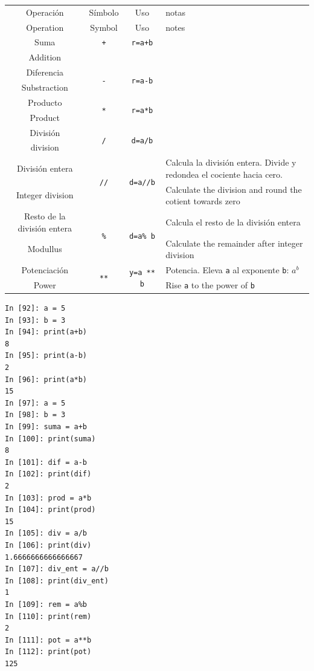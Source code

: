 \begin{table}[h]
\label{tabop}
\centering
\begin{tabularx}{1\textwidth}{cccm{7cm}}
Operación&Símbolo&Uso&notas\\
Operation&Symbol&Uso&notes\\
\hline
Suma&\texttt{+}&\texttt{r=a+b}\\
Addition\\
\hline
Diferencia&\multirow{2}{*}{\texttt{-}}&\multirow{2}{*}{\texttt{r=a-b}}\\
Substraction\\
\hline
Producto&\multirow{2}{*}{\texttt{*}}&\multirow{2}{*}{\texttt{r=a*b}}\\
Product\\
\hline
División&\multirow{2}{*}{\texttt{/}}&\multirow{2}{*}{\texttt{d=a/b}}\\
division\\
\hline
División entera& \multirow{2}{*}{\texttt{//}}& \multirow{2}{*}{\texttt{d=a//b}}&Calcula la división entera. Divide y redondea el cociente hacia cero.\\
Integer division& & &Calculate the division and round the cotient towards zero\\
\hline
Resto de la división entera& \multirow{2}{*}{\texttt{\%}}& \multirow{2}{*}{\texttt{d=a\% b}}& Calcula el resto de la división entera\\
Modullus& & & Calculate the remainder after integer division\\
\hline
Potenciación&\multirow{2}{*}{\texttt{**}}&\multirow{2}{*}{\texttt{y=a ** b}}&Potencia. Eleva \texttt{a} al exponente \texttt{b}: $a^b$ \\
Power & & & Rise \texttt{a} to the power of \texttt{b}\\
\hline
\hline
\end{tabularx}
\end{table}

\begin{center}
    \begin{minipage}{.4\textwidth}
\begin{verbatim}
In [92]: a = 5
In [93]: b = 3
In [94]: print(a+b)
8
In [95]: print(a-b)
2
In [96]: print(a*b)
15
In [97]: a = 5 
In [98]: b = 3
In [99]: suma = a+b
In [100]: print(suma)
8
In [101]: dif = a-b
In [102]: print(dif)
2
In [103]: prod = a*b
In [104]: print(prod)
15
In [105]: div = a/b
In [106]: print(div)
1.6666666666666667
In [107]: div_ent = a//b
In [108]: print(div_ent)
1
In [109]: rem = a%b
In [110]: print(rem)
2
In [111]: pot = a**b
In [112]: print(pot)
125
\end{verbatim}        
    \end{minipage}
\end{center}


